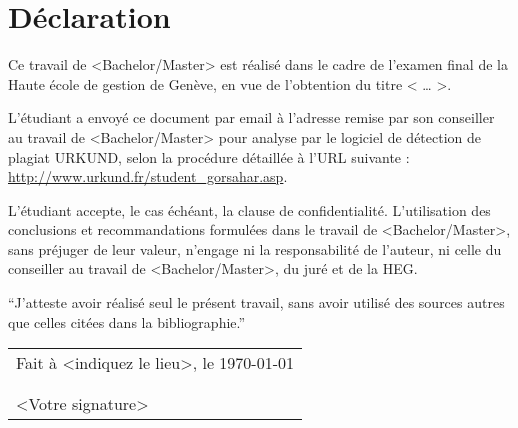 
\newpage

\section*{Déclaration}		%

Ce travail de <Bachelor/Master> est réalisé dans le cadre de l’examen final de la Haute école de gestion de Genève, en vue de l’obtention du titre < … >.

L’étudiant a envoyé ce document par email à l'adresse remise par son conseiller au travail de <Bachelor/Master> pour analyse par le logiciel de détection de plagiat \textsc{URKUND}, selon la procédure détaillée à l’\textsc{UR}L suivante : \url{http://www.urkund.fr/student_gorsahar.asp}.

L’étudiant accepte, le cas échéant, la clause de confidentialité. L'utilisation des conclusions et recommandations formulées dans le travail de <Bachelor/Master>, sans préjuger de leur valeur, n'engage ni la responsabilité de l'auteur, ni celle du conseiller au travail de <Bachelor/Master>, du juré et de la \textsc{HEG}. \bigskip{}


\enquote{J’atteste avoir réalisé seul le présent travail, sans avoir utilisé
des sources autres que celles citées dans la bibliographie.} \vspace{3cm}


\noindent \begin{flushright}
\begin{tabular}{l}
	\makeatletter		%
		Fait à <indiquez le lieu>, le \today{}\tabularnewline
		\@author\tabularnewline
		\tabularnewline
		<Votre signature>		%
	\makeatother
\end{tabular}
\par\end{flushright}

\pagestyle{fancy}
